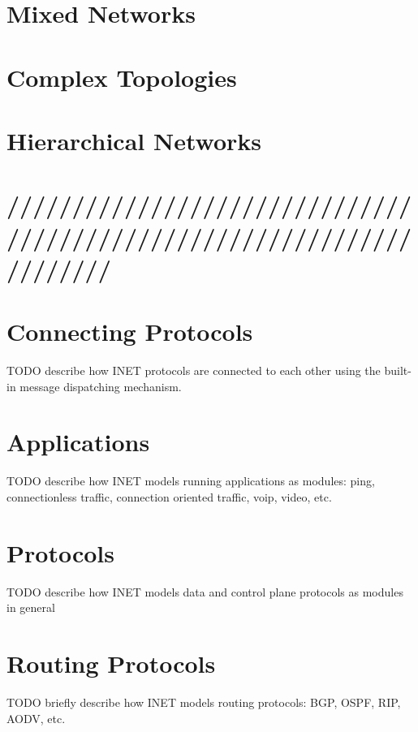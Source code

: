 
\section{Mixed Networks}


\section{Complex Topologies}


\section{Hierarchical Networks}


\section{//////////////////////////////////////////////////////////////////////}


\section{Connecting Protocols}

TODO describe how INET protocols are connected to each other using the built-in message dispatching mechanism.

\section{Applications}
\label{subsec:applications}

TODO describe how INET models running applications as modules: ping, connectionless traffic, connection oriented traffic, voip, video, etc.

\section{Protocols} %
\label{subsec:protocols}

TODO describe how INET models data and control plane protocols as modules in general

\section{Routing Protocols}

TODO briefly describe how INET models routing protocols: BGP, OSPF, RIP, AODV, etc.



